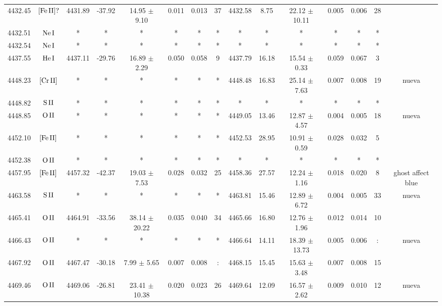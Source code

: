 \documentclass{article}
\begin{document}
\begin{table*}
\begin{adjustbox}{width=\textwidth}
\begin{tabular}{ccccccccccccccc}
4432.45 & $\mbox{[Fe}\thinspace \mbox{II]?}$ & 4431.89 & -37.92 & 14.95 $\pm$ 9.10 & 0.011 & 0.013 & 37 & 4432.58 & 8.75 & 22.12 $\pm$ 10.11 & 0.005 & 0.006 & 28 &  \\
4432.51 & $\mbox{Ne}\thinspace \mbox{I}$ & * & * & * & * & * & * & * & * & * & * & * & * &  \\
4432.54 & $\mbox{Ne}\thinspace \mbox{I}$ & * & * & * & * & * & * & * & * & * & * & * & * &  \\
4437.55 & $\mbox{He}\thinspace \mbox{I}$ & 4437.11 & -29.76 & 16.89 $\pm$ 2.29 & 0.050 & 0.058 & 9 & 4437.79 & 16.18 & 15.54 $\pm$ 0.33 & 0.059 & 0.067 & 3 &  \\
4448.23 & $\mbox{[Cr}\thinspace \mbox{II]}$ & * & * & * & * & * & * & 4448.48 & 16.83 & 25.14 $\pm$ 7.63 & 0.007 & 0.008 & 19 &  nueva \\
4448.82 & $\mbox{S}\thinspace \mbox{II}$ & * & * & * & * & * & * & * & * & * & * & * & * &  \\
4448.85 & $\mbox{O}\thinspace \mbox{II}$ & * & * & * & * & * & * & 4449.05 & 13.46 & 12.87 $\pm$ 4.57 & 0.004 & 0.005 & 18 &  nueva \\
4452.10 & $\mbox{[Fe}\thinspace \mbox{II]}$ & * & * & * & * & * & * & 4452.53 & 28.95 & 10.91 $\pm$ 0.59 & 0.028 & 0.032 & 5 &  \\
4452.38 & $\mbox{O}\thinspace \mbox{II}$ & * & * & * & * & * & * & * & * & * & * & * & * &  \\
4457.95 & $\mbox{[Fe}\thinspace \mbox{II]}$ & 4457.32 & -42.37 & 19.03 $\pm$ 7.53 & 0.028 & 0.032 & 25 & 4458.36 & 27.57 & 12.24 $\pm$ 1.16 & 0.018 & 0.020 & 8 &  ghost affect blue \\
4463.58 & $\mbox{S}\thinspace \mbox{II}$ & * & * & * & * & * & * & 4463.81 & 15.46 & 12.89 $\pm$ 6.72 & 0.004 & 0.005 & 33 &  nueva \\
4465.41 & $\mbox{O}\thinspace \mbox{II}$ & 4464.91 & -33.56 & 38.14 $\pm$ 20.22 & 0.035 & 0.040 & 34 & 4465.66 & 16.80 & 12.76 $\pm$ 1.96 & 0.012 & 0.014 & 10 &  \\
4466.43 & $\mbox{O}\thinspace \mbox{II}$ & * & * & * & * & * & * & 4466.64 & 14.11 & 18.39 $\pm$ 13.73 & 0.005 & 0.006 & : &  nueva \\
4467.92 & $\mbox{O}\thinspace \mbox{II}$ & 4467.47 & -30.18 & 7.99 $\pm$ 5.65 & 0.007 & 0.008 & : & 4468.15 & 15.45 & 15.63 $\pm$ 3.48 & 0.007 & 0.008 & 15 &  \\
4469.46 & $\mbox{O}\thinspace \mbox{II}$ & 4469.06 & -26.81 & 23.41 $\pm$ 10.38 & 0.020 & 0.023 & 26 & 4469.64 & 12.09 & 16.57 $\pm$ 2.62 & 0.009 & 0.010 & 12 &  nueva \\

\end{tabular}
\end{adjustbox}
\end{table*}
\end{document}
